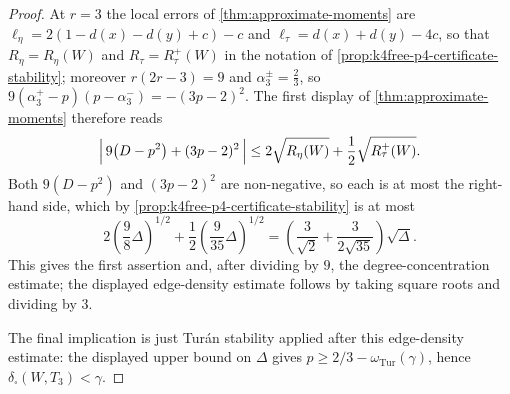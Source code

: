 \documentclass[11pt]{article}
\theoremstyle{definition}
\begin{document}
\begin{proof}
At $r=3$ the local errors of \cref{thm:approximate-moments} are
$\ell_\eta=2(1-d(x)-d(y)+c)-c$ and $\ell_\tau=d(x)+d(y)-4c$, so that
$R_\eta=R_\eta(W)$ and $R_\tau=R_\tau^{+}(W)$ in the notation of
\cref{prop:k4free-p4-certificate-stability}; moreover $r(2r-3)=9$ and
$\alpha_3^\pm=\frac23$, so $9(\alpha_3^+-p)(p-\alpha_3^-)=-(3p-2)^2$.  The first display
of \cref{thm:approximate-moments} therefore reads
\[
  \Bigl|\,9\bigl(D-p^2\bigr)+(3p-2)^2\,\Bigr|
  \le
  2\sqrt{R_\eta(W)}+\frac12\sqrt{R_\tau^{+}(W)} .
\]
Both $9(D-p^2)$ and $(3p-2)^2$ are non-negative, so each is at most the right-hand side,
which by \cref{prop:k4free-p4-certificate-stability} is at most
\[
  2\left(\frac98\Delta\right)^{1/2}
  +\frac12\left(\frac9{35}\Delta\right)^{1/2}
  =
  \left(\frac{3}{\sqrt2}+\frac{3}{2\sqrt{35}}\right)\sqrt{\Delta}.
\]
This gives the first assertion and, after dividing by $9$, the degree-concentration
estimate; the displayed edge-density estimate follows by taking square roots and
dividing by $3$.

The final implication is just Tur\'an stability applied after this edge-density estimate:
the displayed upper bound on $\Delta$ gives
$p\ge2/3-\omega_{\mathrm{Tur}}(\gamma)$, hence
$\delta_\square(W,T_3)<\gamma$.
\end{proof}
\end{document}

